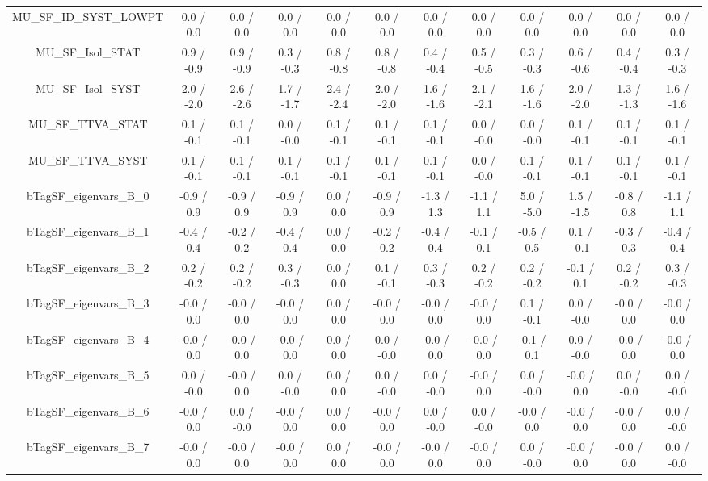 \begin{table}[htbp]
\begin{center}
\begin{tabular}{|c|c|c|c|c|c|c|c|c|c|c|c|}
  MU_SF_ID_SYST_LOWPT & 0.0 / 0.0 & 0.0 / 0.0 & 0.0 / 0.0 & 0.0 / 0.0 & 0.0 / 0.0 & 0.0 / 0.0 & 0.0 / 0.0 & 0.0 / 0.0 & 0.0 / 0.0 & 0.0 / 0.0 & 0.0 / 0.0 \\ 
  MU_SF_Isol_STAT & 0.9 / -0.9 & 0.9 / -0.9 & 0.3 / -0.3 & 0.8 / -0.8 & 0.8 / -0.8 & 0.4 / -0.4 & 0.5 / -0.5 & 0.3 / -0.3 & 0.6 / -0.6 & 0.4 / -0.4 & 0.3 / -0.3 \\ 
  MU_SF_Isol_SYST & 2.0 / -2.0 & 2.6 / -2.6 & 1.7 / -1.7 & 2.4 / -2.4 & 2.0 / -2.0 & 1.6 / -1.6 & 2.1 / -2.1 & 1.6 / -1.6 & 2.0 / -2.0 & 1.3 / -1.3 & 1.6 / -1.6 \\ 
  MU_SF_TTVA_STAT & 0.1 / -0.1 & 0.1 / -0.1 & 0.0 / -0.0 & 0.1 / -0.1 & 0.1 / -0.1 & 0.1 / -0.1 & 0.0 / -0.0 & 0.0 / -0.0 & 0.1 / -0.1 & 0.1 / -0.1 & 0.1 / -0.1 \\ 
  MU_SF_TTVA_SYST & 0.1 / -0.1 & 0.1 / -0.1 & 0.1 / -0.1 & 0.1 / -0.1 & 0.1 / -0.1 & 0.1 / -0.1 & 0.0 / -0.0 & 0.1 / -0.1 & 0.1 / -0.1 & 0.1 / -0.1 & 0.1 / -0.1 \\ 
  bTagSF_eigenvars_B_0 & -0.9 / 0.9 & -0.9 / 0.9 & -0.9 / 0.9 & 0.0 / 0.0 & -0.9 / 0.9 & -1.3 / 1.3 & -1.1 / 1.1 & 5.0 / -5.0 & 1.5 / -1.5 & -0.8 / 0.8 & -1.1 / 1.1 \\ 
  bTagSF_eigenvars_B_1 & -0.4 / 0.4 & -0.2 / 0.2 & -0.4 / 0.4 & 0.0 / 0.0 & -0.2 / 0.2 & -0.4 / 0.4 & -0.1 / 0.1 & -0.5 / 0.5 & 0.1 / -0.1 & -0.3 / 0.3 & -0.4 / 0.4 \\ 
  bTagSF_eigenvars_B_2 & 0.2 / -0.2 & 0.2 / -0.2 & 0.3 / -0.3 & 0.0 / 0.0 & 0.1 / -0.1 & 0.3 / -0.3 & 0.2 / -0.2 & 0.2 / -0.2 & -0.1 / 0.1 & 0.2 / -0.2 & 0.3 / -0.3 \\ 
  bTagSF_eigenvars_B_3 & -0.0 / 0.0 & -0.0 / 0.0 & -0.0 / 0.0 & 0.0 / 0.0 & -0.0 / 0.0 & -0.0 / 0.0 & -0.0 / 0.0 & 0.1 / -0.1 & 0.0 / -0.0 & -0.0 / 0.0 & -0.0 / 0.0 \\ 
  bTagSF_eigenvars_B_4 & -0.0 / 0.0 & -0.0 / 0.0 & -0.0 / 0.0 & 0.0 / 0.0 & 0.0 / -0.0 & -0.0 / 0.0 & -0.0 / 0.0 & -0.1 / 0.1 & 0.0 / -0.0 & -0.0 / 0.0 & -0.0 / 0.0 \\ 
  bTagSF_eigenvars_B_5 & 0.0 / -0.0 & -0.0 / 0.0 & 0.0 / -0.0 & 0.0 / 0.0 & 0.0 / -0.0 & 0.0 / -0.0 & -0.0 / 0.0 & 0.0 / -0.0 & -0.0 / 0.0 & 0.0 / -0.0 & 0.0 / -0.0 \\ 
  bTagSF_eigenvars_B_6 & -0.0 / 0.0 & 0.0 / -0.0 & -0.0 / 0.0 & 0.0 / 0.0 & -0.0 / 0.0 & 0.0 / -0.0 & 0.0 / -0.0 & -0.0 / 0.0 & -0.0 / 0.0 & -0.0 / 0.0 & 0.0 / -0.0 \\ 
  bTagSF_eigenvars_B_7 & -0.0 / 0.0 & -0.0 / 0.0 & -0.0 / 0.0 & 0.0 / 0.0 & -0.0 / 0.0 & -0.0 / 0.0 & -0.0 / 0.0 & 0.0 / -0.0 & -0.0 / 0.0 & -0.0 / 0.0 & 0.0 / -0.0 \\ 

\end{tabular}
\end{center}
\end{table}
